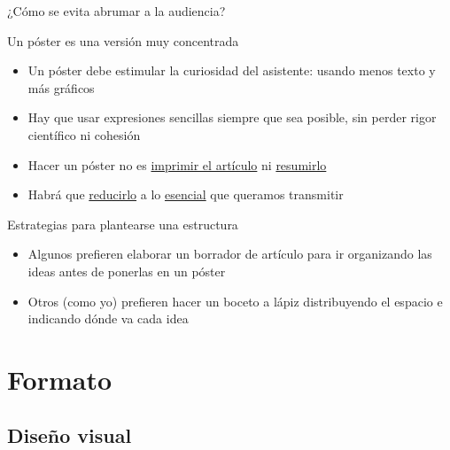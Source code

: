 \documentclass[xcolor=svgnames,compress]{beamer}
\begin{document}
\begin{frame}{¿Cómo se evita abrumar a la audiencia?}

  \begin{block}{Un póster es una versión muy concentrada}
    \begin{itemize}
    \item Un póster debe estimular la curiosidad del asistente: usando
      menos texto y más gráficos
    \item Hay que usar expresiones sencillas siempre que sea posible,
      sin perder rigor científico ni cohesión
    \item Hacer un póster no es
      \href{http://www.flickr.com/photos/somayalangley/2565759527/}{imprimir
        el artículo} ni
      \href{http://www.flickr.com/photos/bassoonman_kap/5633474323/in/pool-688685@N24/}{resumirlo}
    \item Habrá que
      \href{http://www.flickr.com/search/?w=97127962@N00\&q=poster}{reducirlo}
      a lo \href{http://www.flickr.com/photos/materials-stuff/6193567858/in/pool-368476@N21/}{esencial} que queramos transmitir
    \end{itemize}
  \end{block}

  \begin{block}{Estrategias para plantearse una estructura}
    \begin{itemize}
    \item Algunos prefieren elaborar un borrador de artículo para ir
      organizando las ideas antes de ponerlas en un póster
    \item Otros (como yo) prefieren hacer un boceto a lápiz
      distribuyendo el espacio e indicando dónde va cada idea
    \end{itemize}
  \end{block}

\end{frame}

\section{Formato}

\subsection{Diseño visual}
\end{document}

